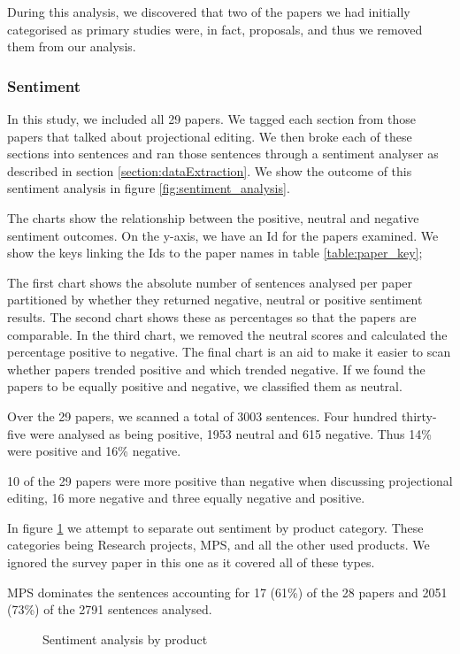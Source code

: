 During this analysis, we discovered that two of the papers we had initially categorised as primary studies were, in fact, proposals, and thus we removed them from our analysis.

\subsubsection{Sentiment}

In this study, we included all 29 papers.
We tagged each section from those papers that talked about projectional editing.
We then broke each of these sections into sentences and ran those sentences through a sentiment analyser as described in section \ref{section:dataExtraction}.
We show the outcome of this sentiment analysis in figure \ref{fig:sentiment_analysis}.

The charts show the relationship between the positive, neutral and negative sentiment outcomes.
On the y-axis, we have an Id for the papers examined. 
We show the keys linking the Ids to the paper names in table \ref{table:paper_key};

The first chart shows the absolute number of sentences analysed per paper partitioned by whether they returned negative, neutral or positive sentiment results.
The second chart shows these as percentages so that the papers are comparable.
In the third chart, we removed the neutral scores and calculated the percentage positive to negative.
The final chart is an aid to make it easier to scan whether papers trended positive and which trended negative.
If we found the papers to be equally positive and negative, we classified them as neutral.

Over the 29 papers, we scanned a total of 3003 sentences.
Four hundred thirty-five were analysed as being positive, 1953 neutral and 615 negative.
Thus 14\% were positive and 16\% negative.

10 of the 29 papers were more positive than negative when discussing projectional editing, 16 more negative and three equally negative and positive.

In figure \ref{fig:sentiment_analysis2} we attempt to separate out sentiment by product category.  
These categories being Research projects, MPS, and all the other used products.
We ignored the survey paper in this one as it covered all of these types.

MPS dominates the sentences accounting for 17 (61\%) of the 28 papers and 2051 (73\%) of the 2791 sentences analysed.

\begin{figure}[h]
    \centering
    \caption{Sentiment analysis by product}
    \label{fig:sentiment_analysis2}
\end{figure}

